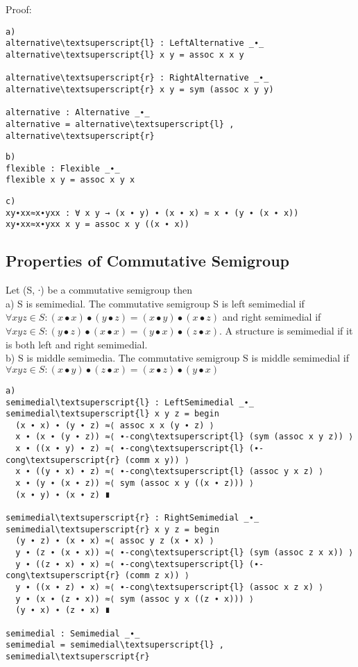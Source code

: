 Proof:
\begin{Verbatim}[commandchars=\\\{\},samepage=true]
a)
alternative\textsuperscript{l} : LeftAlternative _∙_
alternative\textsuperscript{l} x y = assoc x x y

alternative\textsuperscript{r} : RightAlternative _∙_
alternative\textsuperscript{r} x y = sym (assoc x y y)

alternative : Alternative _∙_
alternative = alternative\textsuperscript{l} , alternative\textsuperscript{r}
\end{Verbatim}
 
\begin{Verbatim}[commandchars=\\\{\},samepage=true]
b)
flexible : Flexible _∙_
flexible x y = assoc x y x
\end{Verbatim}

\begin{Verbatim}[commandchars=\\\{\},samepage=true]
c)
xy∙xx≈x∙yxx : ∀ x y → (x ∙ y) ∙ (x ∙ x) ≈ x ∙ (y ∙ (x ∙ x))
xy∙xx≈x∙yxx x y = assoc x y ((x ∙ x))
\end{Verbatim}
\subsection{Properties of Commutative Semigroup}
Let (S, ∙) be a commutative semigroup then\\
a) S is semimedial. The commutative semigroup S is left semimedial if  \( \forall x y z \in S: (x ∙ x) ∙ (y ∙ z) = (x ∙ y) ∙ (x ∙ z) \) and right semimedial if \( \forall x y z \in S: (y ∙ z) ∙ (x ∙ x) = (y ∙ x) ∙ (z ∙ x) \). A structure is semimedial if it is both left and right semimedial. \\
b) S is middle semimedia.  The commutative semigroup S is middle semimedial if  \(\forall x y z  \in S: (x ∙ y) ∙ (z ∙ x) = (x ∙ z) ∙ (y ∙ x)\)\\
\begin{Verbatim}[commandchars=\\\{\},samepage=true]
a)
semimedial\textsuperscript{l} : LeftSemimedial _∙_
semimedial\textsuperscript{l} x y z = begin
  (x ∙ x) ∙ (y ∙ z) ≈⟨ assoc x x (y ∙ z) ⟩
  x ∙ (x ∙ (y ∙ z)) ≈⟨ ∙-cong\textsuperscript{l} (sym (assoc x y z)) ⟩
  x ∙ ((x ∙ y) ∙ z) ≈⟨ ∙-cong\textsuperscript{l} (∙-cong\textsuperscript{r} (comm x y)) ⟩
  x ∙ ((y ∙ x) ∙ z) ≈⟨ ∙-cong\textsuperscript{l} (assoc y x z) ⟩
  x ∙ (y ∙ (x ∙ z)) ≈⟨ sym (assoc x y ((x ∙ z))) ⟩
  (x ∙ y) ∙ (x ∙ z) ∎

semimedial\textsuperscript{r} : RightSemimedial _∙_
semimedial\textsuperscript{r} x y z = begin
  (y ∙ z) ∙ (x ∙ x) ≈⟨ assoc y z (x ∙ x) ⟩
  y ∙ (z ∙ (x ∙ x)) ≈⟨ ∙-cong\textsuperscript{l} (sym (assoc z x x)) ⟩
  y ∙ ((z ∙ x) ∙ x) ≈⟨ ∙-cong\textsuperscript{l} (∙-cong\textsuperscript{r} (comm z x)) ⟩
  y ∙ ((x ∙ z) ∙ x) ≈⟨ ∙-cong\textsuperscript{l} (assoc x z x) ⟩
  y ∙ (x ∙ (z ∙ x)) ≈⟨ sym (assoc y x ((z ∙ x))) ⟩
  (y ∙ x) ∙ (z ∙ x) ∎

semimedial : Semimedial _∙_
semimedial = semimedial\textsuperscript{l} , semimedial\textsuperscript{r}
\end{Verbatim}

